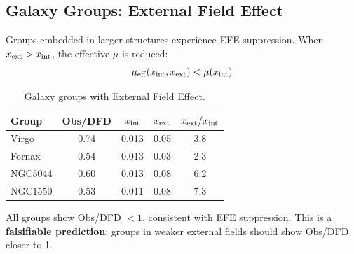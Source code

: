 \subsection{Galaxy Groups: External Field Effect}

Groups embedded in larger structures experience EFE suppression. When $x_{\rm ext} > x_{\rm int}$, the effective $\mu$ is reduced:
\begin{equation}
\mu_{\rm eff}(x_{\rm int}, x_{\rm ext}) < \mu(x_{\rm int})
\end{equation}

\begin{table}[h]
\centering
\caption{Galaxy groups with External Field Effect.}\label{tab:groups-efe}
\begin{tabular}{lcccc}
\toprule
Group & Obs/DFD & $x_{\rm int}$ & $x_{\rm ext}$ & $x_{\rm ext}/x_{\rm int}$ \\
\midrule
Virgo & 0.74 & 0.013 & 0.05 & 3.8 \\
Fornax & 0.54 & 0.013 & 0.03 & 2.3 \\
NGC5044 & 0.60 & 0.013 & 0.08 & 6.2 \\
NGC1550 & 0.53 & 0.011 & 0.08 & 7.3 \\
\bottomrule
\end{tabular}
\end{table}

All groups show Obs/DFD $< 1$, consistent with EFE suppression. This is a \textbf{falsifiable prediction}: groups in weaker external fields should show Obs/DFD closer to 1.

